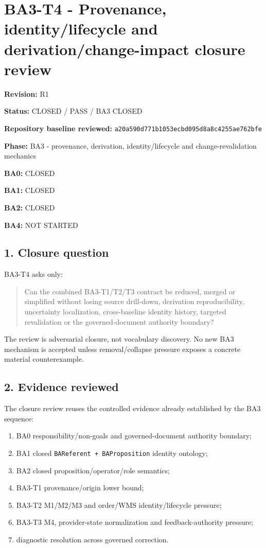 \documentclass[11pt,a4paper]{article}
\providecommand{\tightlist}{\setlength{\itemsep}{0pt}\setlength{\parskip}{0pt}}
\begin{document}
\section{BA3-T4 - Provenance, identity/lifecycle and derivation/change-impact closure review}\label{ba3-t4---provenance-identitylifecycle-and-derivationchange-impact-closure-review}

\textbf{Revision:} R1

\textbf{Status:} CLOSED / PASS / BA3 CLOSED

\textbf{Repository baseline reviewed:} \texttt{a20a590d771b1053ecbd095d8a8c4255ae762bfe}

\textbf{Phase:} BA3 - provenance, derivation, identity/lifecycle and change-revalidation mechanics

\textbf{BA0:} CLOSED

\textbf{BA1:} CLOSED

\textbf{BA2:} CLOSED

\textbf{BA4:} NOT STARTED

\subsection{1. Closure question}\label{closure-question}

BA3-T4 asks only:

\begin{quote}
Can the combined BA3-T1/T2/T3 contract be reduced, merged or simplified without losing source drill-down, derivation reproducibility, uncertainty localization, cross-baseline identity history, targeted revalidation or the governed-document authority boundary?
\end{quote}

The review is adversarial closure, not vocabulary discovery. No new BA3 mechanism is accepted unless removal/collapse pressure exposes a concrete material counterexample.

\subsection{2. Evidence reviewed}\label{evidence-reviewed}

The closure review reuses the controlled evidence already established by the BA3 sequence:

\begin{enumerate}
\def\labelenumi{\arabic{enumi}.}
\tightlist
\item
  BA0 responsibility/non-goals and governed-document authority boundary;
\item
  BA1 closed \texttt{BAReferent\ +\ BAProposition} identity ontology;
\item
  BA2 closed proposition/operator/role semantics;
\item
  BA3-T1 provenance/origin lower bound;
\item
  BA3-T2 M1/M2/M3 and order/WMS identity/lifecycle pressure;
\item
  BA3-T3 M4, provider-state normalization and feedback-authority pressure;
\item
  diagnostic resolution across governed correction.
\end{enumerate}
\end{document}
